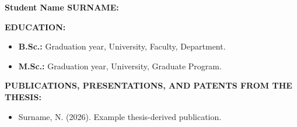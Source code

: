 \textbf{Student Name SURNAME:}

\textbf{EDUCATION:}
\begin{itemize}
  \item \textbf{B.Sc.:} Graduation year, University, Faculty, Department.
  \item \textbf{M.Sc.:} Graduation year, University, Graduate Program.
\end{itemize}

\textbf{PUBLICATIONS, PRESENTATIONS, AND PATENTS FROM THE THESIS:}
\begin{itemize}
  \item Surname, N. (2026). Example thesis-derived publication.
\end{itemize}
